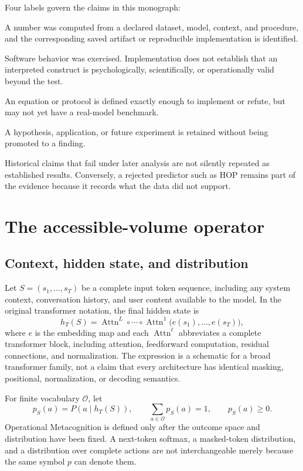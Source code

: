 Four labels govern the claims in this monograph:
\begin{description}[style=nextline]
  \item[Measured.] A number was computed from a declared dataset, model, context, and procedure, and the corresponding saved artifact or reproducible implementation is identified.
  \item[Implemented.] Software behavior was exercised. Implementation does not establish that an interpreted construct is psychologically, scientifically, or operationally valid beyond the test.
  \item[Formulated.] An equation or protocol is defined exactly enough to implement or refute, but may not yet have a real-model benchmark.
  \item[Proposed.] A hypothesis, application, or future experiment is retained without being promoted to a finding.
\end{description}
Historical claims that fail under later analysis are not silently repeated as established results. Conversely, a rejected predictor such as HOP remains part of the evidence because it records what the data did not support.

\section{The accessible-volume operator}
\subsection{Context, hidden state, and distribution}
Let $S=(s_1,\ldots,s_T)$ be a complete input token sequence, including any system context, conversation history, and user content available to the model. In the original transformer notation, the final hidden state is
\begin{equation}
h_T(S)=\operatorname{Attn}^{L}\circ\cdots\circ\operatorname{Attn}^{1}
       \bigl(e(s_1),\ldots,e(s_T)\bigr),
\label{eq:hidden-state}
\end{equation}
where $e$ is the embedding map and each $\operatorname{Attn}^{\ell}$ abbreviates a complete transformer block, including attention, feedforward computation, residual connections, and normalization. The expression is a schematic for a broad transformer family, not a claim that every architecture has identical masking, positional, normalization, or decoding semantics.

For finite vocabulary $\mathcal O$, let
\begin{equation}
p_S(a)=P\!\left(a\mid h_T(S)\right),\qquad \sum_{a\in\mathcal O}p_S(a)=1,
\qquad p_S(a)\geq0.
\end{equation}
Operational Metacognition is defined only after the outcome space and distribution have been fixed. A next-token softmax, a masked-token distribution, and a distribution over complete actions are not interchangeable merely because the same symbol $p$ can denote them.

